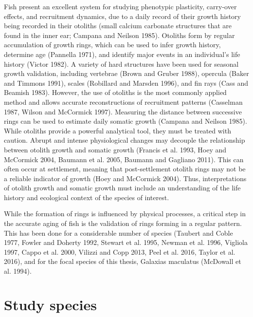 \documentclass[]{book}
\begin{document}
Fish present an excellent system for studying phenotypic plasticity,
carry-over effects, and recruitment dynamics, due to a daily record of
their growth history being recorded in their otoliths (small calcium
carbonate structures that are found in the inner ear; Campana and
Neilson 1985). Otoliths form by regular accumulation of growth rings,
which can be used to infer growth history, determine age (Pannella
1971), and identify major events in an individual's life history (Victor
1982). A variety of hard structures have been used for seasonal growth
validation, including vertebrae (Brown and Gruber 1988), opercula (Baker
and Timmons 1991), scales (Robillard and Marsden 1996), and fin rays
(Cass and Beamish 1983). However, the use of otoliths is the most
commonly applied method and allows accurate reconstructions of
recruitment patterns (Casselman 1987, Wilson and McCormick 1997).
Measuring the distance between successive rings can be used to estimate
daily somatic growth (Campana and Neilson 1985). While otoliths provide
a powerful analytical tool, they must be treated with caution. Abrupt
and intense physiological changes may decouple the relationship between
otolith growth and somatic growth (Francis et al. 1993, Hoey and
McCormick 2004, Baumann et al. 2005, Baumann and Gagliano 2011). This
can often occur at settlement, meaning that post-settlement otolith
rings may not be a reliable indicator of growth (Hoey and McCormick
2004). Thus, interpretations of otolith growth and somatic growth must
include an understanding of the life history and ecological context of
the species of interest.

While the formation of rings is influenced by physical processes, a
critical step in the accurate aging of fish is the validation of rings
forming in a regular pattern. This has been done for a considerable
number of species (Taubert and Coble 1977, Fowler and Doherty 1992,
Stewart et al. 1995, Newman et al. 1996, Vigliola 1997, Cappo et al.
2000, Vilizzi and Copp 2013, Peel et al. 2016, Taylor et al. 2016), and
for the focal species of this thesis, Galaxias maculatus (McDowall et
al. 1994).

\section{Study species}\label{study-species}
\end{document}
